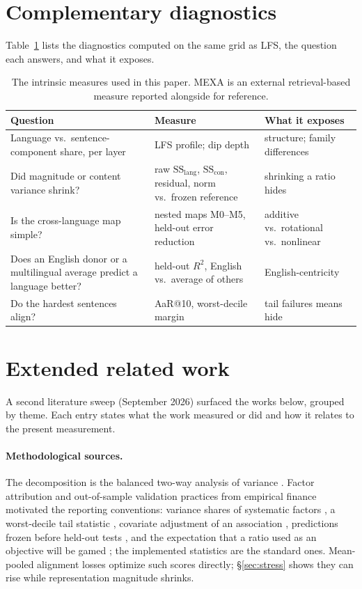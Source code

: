 \documentclass{article} %
\newcommand{\SSl}{\mathrm{SS}_{\mathrm{lang}}}
\newcommand{\SSc}{\mathrm{SS}_{\mathrm{con}}}
\begin{document}
\section{Complementary diagnostics}
\label{app:family}
Table~\ref{tab:family} lists the diagnostics computed on the same grid as LFS, the question each answers, and what it exposes.
\begin{table}[h]
\caption{The intrinsic measures used in this paper. MEXA \citep{kargaran2024mexa} is an external retrieval-based measure reported alongside for reference.}
\label{tab:family}
\begin{center}
\small
\begin{tabular}{p{4.2cm}p{4.0cm}p{3.6cm}}
\toprule
Question & Measure & What it exposes \\
\midrule
Language vs.\ sentence-component share, per layer & LFS profile; dip depth & structure; family differences \\
Did magnitude or content variance shrink? & raw $\SSl$, $\SSc$, residual, norm vs.\ frozen reference & shrinking a ratio hides \\
Is the cross-language map simple? & nested maps M0--M5, held-out error reduction & additive vs.\ rotational vs.\ nonlinear \\
Does an English donor or a multilingual average predict a language better? & held-out $R^2$, English vs.\ average of others & English-centricity \\
Do the hardest sentences align? & AaR@10, worst-decile margin & tail failures means hide \\
\bottomrule
\end{tabular}
\end{center}
\end{table}

\section{Extended related work}
\label{app:related}
A second literature sweep (September 2026) surfaced the works below, grouped by theme. Each entry states what the work measured or did and how it relates to the present measurement.

\paragraph{Methodological sources.} The decomposition is the balanced two-way analysis of variance \citep{fisher1925}. Factor attribution and out-of-sample validation practices from empirical finance motivated the reporting conventions: variance shares of systematic factors \citep{ross1976apt,fama1993factors}, a worst-decile tail statistic \citep{artzner1999coherent,rockafellar2000cvar}, covariate adjustment of an association \citep{sharpe1966,jensen1968}, predictions frozen before held-out tests \citep{bailey2014deflated,bailey2014pseudo,lopezdeprado2018}, and the expectation that a ratio used as an objective will be gamed \citep{goodhart1975,strathern1997}; the implemented statistics are the standard ones. Mean-pooled alignment losses \citep{liu2025middle,bu2025alignx} optimize such scores directly; \S\ref{sec:stress} shows they can rise while representation magnitude shrinks.
\end{document}
